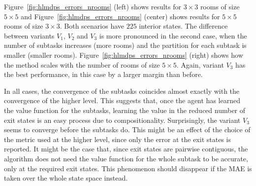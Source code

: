 Figure~\ref{fig:hlmdps_errors_nrooms} (left) shows results for $3\times 3$ rooms of size $5\times 5$ and Figure~\ref{fig:hlmdps_errors_nrooms} (center) shows results for $5\times 5$ rooms of size $3\times 3$. Both scenarios have $225$ interior states.
The difference between variants $V_1$, $V_2$ and $V_3$ is more pronounced in the second case, when the number of subtasks increases (more rooms) and the partition for each subtask is smaller (smaller rooms). Figure~\ref{fig:hlmdps_errors_nrooms} (right) shows how the method scales with the number of rooms of size $5\times 5$.
Again, variant $V_3$ has the best performance, in this case by a larger 
margin than before.

In all cases, the convergence of the subtasks coincides almost exactly with the convergence of the higher level. This suggests that, once the agent has learned the value function for the subtasks, learning the value in the reduced number of exit states is an easy process due to compositionality. Surprisingly, the variant $V_3$ seems to converge before the subtasks do. This might be an effect of the choice of the metric used at the higher level, since only the error at the exit states is reported. It might be the case that, since exit states are pairwise contiguous, the algorithm does not need the value function for the whole subtask to be accurate, only at the required exit states. This phenomenon should disappear if the MAE is taken over the whole state space instead.








